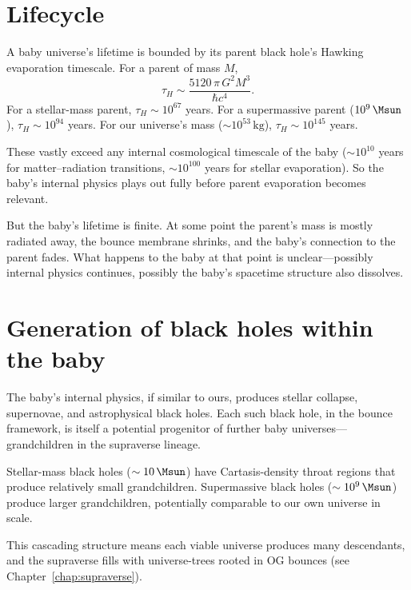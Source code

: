 \section{Lifecycle}

A baby universe's lifetime is bounded by its parent black hole's Hawking
evaporation timescale. For a parent of mass $M$,
\[
  \tau_H \sim \frac{5120\,\pi\, G^2 M^3}{\hbar c^4}.
\]
For a stellar-mass parent, $\tau_H \sim 10^{67}$ years. For a supermassive
parent ($10^{9}\,\Msun$), $\tau_H \sim 10^{94}$ years. For our universe's mass
($\sim 10^{53}\,\mathrm{kg}$), $\tau_H \sim 10^{145}$ years.

These vastly exceed any internal cosmological timescale of the baby
($\sim 10^{10}$ years for matter--radiation transitions, $\sim 10^{100}$ years
for stellar evaporation). So the baby's internal physics plays out fully before
parent evaporation becomes relevant.

But the baby's lifetime is finite. At some point the parent's mass is mostly
radiated away, the bounce membrane shrinks, and the baby's connection to the
parent fades. What happens to the baby at that point is unclear---possibly
internal physics continues, possibly the baby's spacetime structure also
dissolves.

\section{Generation of black holes within the baby}

The baby's internal physics, if similar to ours, produces stellar collapse,
supernovae, and astrophysical black holes. Each such black hole, in the bounce
framework, is itself a potential progenitor of further baby universes---
grandchildren in the supraverse lineage.

Stellar-mass black holes ($\sim 10\,\Msun$) have Cartasis-density throat regions
that produce relatively small grandchildren. Supermassive black holes
($\sim 10^{9}\,\Msun$) produce larger grandchildren, potentially comparable to
our own universe in scale.

This cascading structure means each viable universe produces many descendants,
and the supraverse fills with universe-trees rooted in OG bounces (see
Chapter~\ref{chap:supraverse}).
